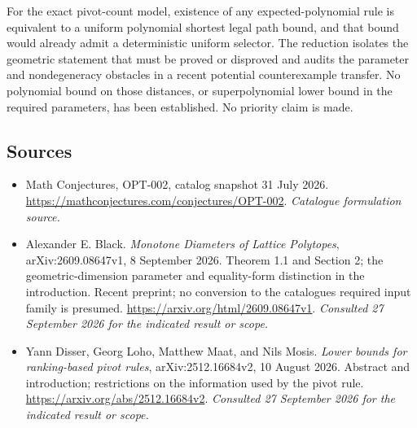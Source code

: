 \documentclass[11pt,a4paper]{article}
\numberwithin{equation}{section}
\begin{document}
For the exact pivot-count model, existence of any expected-polynomial
rule is equivalent to a uniform polynomial shortest legal path bound,
and that bound would already admit a deterministic uniform selector.
The reduction isolates the geometric statement that must be proved or
disproved and audits the parameter and nondegeneracy obstacles in a
recent potential counterexample transfer.  No polynomial bound on
those distances, or superpolynomial lower bound in the required
parameters, has been established.  No priority claim is made.
\subsection{Sources}
\begin{itemize}\raggedright
\item[\textnormal{[S1]}]\hypertarget{source:statement:1}{} Math Conjectures, OPT-002, catalog snapshot 31 July 2026.
\url{https://mathconjectures.com/conjectures/OPT-002}.
{\small\textit{Catalogue formulation source.}}
\item[\textnormal{[E1]}]\hypertarget{extra:statement:1}{} Alexander E. Black.
\emph{Monotone Diameters of Lattice Polytopes}, arXiv:2609.08647v1, 8 September 2026. Theorem 1.1 and Section 2; the geometric-dimension parameter and equality-form distinction in the introduction. Recent preprint; no conversion to the catalogue\textquotesingle s required input family is presumed.
\url{https://arxiv.org/html/2609.08647v1}.
{\small\textit{Consulted 27 September 2026 for the indicated result or scope.}}
\item[\textnormal{[E2]}]\hypertarget{extra:statement:2}{} Yann Disser, Georg Loho, Matthew Maat, and Nils Mosis.
\emph{Lower bounds for ranking-based pivot rules}, arXiv:2512.16684v2, 10 August 2026. Abstract and introduction; restrictions on the information used by the pivot rule.
\url{https://arxiv.org/abs/2512.16684v2}.
{\small\textit{Consulted 27 September 2026 for the indicated result or scope.}}
\end{itemize}
\end{document}
